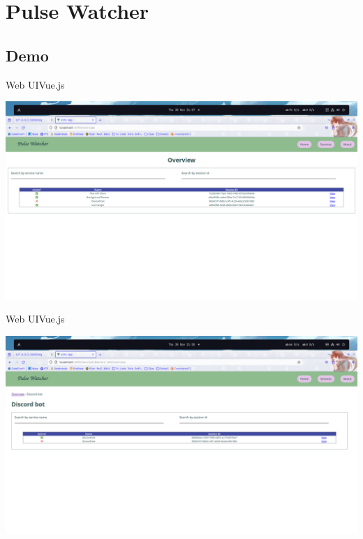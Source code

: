 \documentclass{beamer}
\begin{document}
\section{Pulse Watcher}

\subsection{Demo}

\begin{frame}{Web UI}{Vue.js}

\includegraphics[width=\linewidth,keepaspectratio]{web_ui_1.png}

\end{frame}

\begin{frame}{Web UI}{Vue.js}

\includegraphics[width=\linewidth,keepaspectratio]{web_ui_2.png}

\end{frame}
\end{document}
